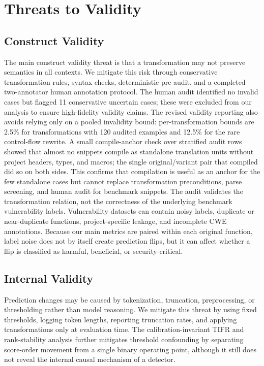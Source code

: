 \documentclass[a4paper,fleqn]{cas-dc}
\begin{document}
\section{Threats to Validity}

\subsection{Construct Validity}

The main construct validity threat is that a transformation may not preserve
semantics in all contexts. We mitigate this risk through conservative
transformation rules, syntax checks, deterministic pre-audit, and a completed
two-annotator human annotation protocol. The human audit identified no invalid
cases but flagged 11 conservative uncertain cases; these were excluded from our
analysis to ensure high-fidelity validity claims.
The revised validity reporting also avoids relying only on a pooled invalidity
bound: per-transformation bounds are 2.5\% for transformations with 120 audited
examples and 12.5\% for the rare control-flow rewrite. A small compile-anchor
check over stratified audit rows showed that almost no snippets compile as
standalone translation units without project headers, types, and macros; the
single original/variant pair that compiled did so on both sides. This confirms
that compilation is useful as an anchor for the few standalone cases but cannot
replace transformation preconditions, parse screening, and human audit for
benchmark snippets.
The audit validates the transformation relation, not the correctness of the
underlying benchmark vulnerability labels. Vulnerability datasets can contain
noisy labels, duplicate or near-duplicate functions, project-specific leakage,
and incomplete CWE annotations. Because our main metrics are paired within each
original function, label noise does not by itself create prediction flips, but
it can affect whether a flip is classified as harmful, beneficial, or
security-critical.

\subsection{Internal Validity}

Prediction changes may be caused by tokenization, truncation, preprocessing,
or thresholding rather than model reasoning. We mitigate this threat by using
fixed thresholds, logging token lengths, reporting truncation rates, and
applying transformations only at evaluation time. The calibration-invariant
TIFR and rank-stability analysis further mitigates threshold confounding by
separating score-order movement from a single binary operating point, although
it still does not reveal the internal causal mechanism of a detector.
\end{document}
